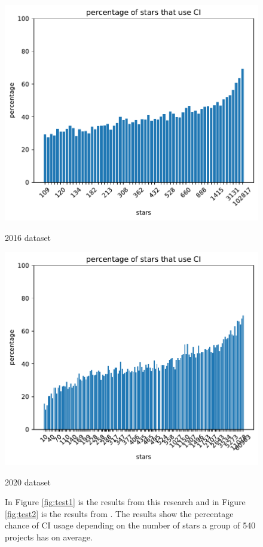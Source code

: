 \documentclass[10pt,conference]{IEEEtran}
\begin{document}
\begin{figure}[!htbp]
  \centering
  \begin{minipage}{.48\textwidth}
    \centering
    \includegraphics[width=.9\textwidth]{../src/results/percentage sub with CI other paper source.pdf}
    \caption[]{2016 dataset}
    \label{fig:test1}
  \end{minipage}
  \begin{minipage}{.48\textwidth}
    \centering
    \includegraphics[width=.9\textwidth]{../src/results/percentage stars with CI.pdf}
    \caption{2020 dataset}
    \label{fig:test2}
  \end{minipage}%
  \hfill
  \caption{In Figure \ref{fig:test1} is the results from this research and in Figure \ref{fig:test2} is the results from \cite{Hilton2016}. The results show the percentage chance of CI usage depending on the number of stars a group of 540 projects has on average.}
  \label{fig:comparison_percentage_star_usage}
\end{figure}
\end{document}
